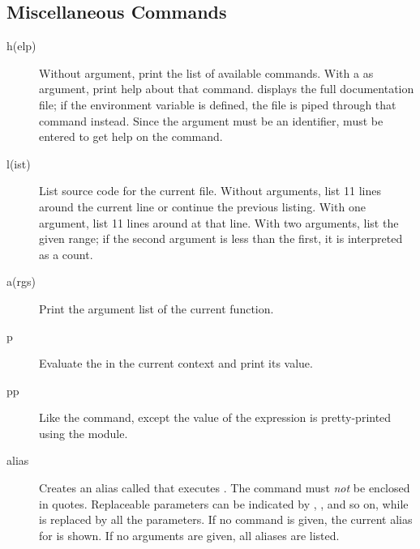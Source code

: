 \subsection{Miscellaneous Commands}
\begin{description}

\item[h(elp) ]

Without argument, print the list of available commands.  With a
 as argument, print help about that command.   displays the full documentation file; if the environment variable
 is defined, the file is piped through that command
instead.  Since the  argument must be an identifier,
 must be entered to get help on the \samp{!} command.

\item[l(ist) ]

List source code for the current file.  Without arguments, list 11
lines around the current line or continue the previous listing.  With
one argument, list 11 lines around at that line.  With two arguments,
list the given range; if the second argument is less than the first,
it is interpreted as a count.

\item[a(rgs)]

Print the argument list of the current function.

\item[p ]

Evaluate the  in the current context and print its
value.  

\item[pp ]

Like the  command, except the value of the expression is
pretty-printed using the  module.

\item[alias ]

Creates an alias called  that executes .  The
command must \emph{not} be enclosed in quotes.  Replaceable parameters
can be indicated by , , and so on, while \samp{\%*} is
replaced by all the parameters.  If no command is given, the current
alias for  is shown. If no arguments are given, all
aliases are listed.


\end{description}
